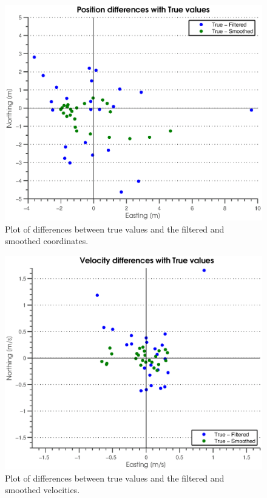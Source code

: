 

\begin{figure}[htbp]
	\centering
		\includegraphics[width=\MyWidth]{Figures/diffPlots.eps}
	\caption{Plot of differences between true values and the filtered and smoothed coordinates.}
	\label{fig:Figures_diffPlots}
\end{figure} %
\begin{figure}[htbp]
	\centering
		\includegraphics[width=\MyWidth]{Figures/diffPlotsVelocity.eps}
	\caption{Plot of differences between true values and the filtered and smoothed velocities.}
	\label{fig:Figures_diffPlotsVelocity}
\end{figure} %
